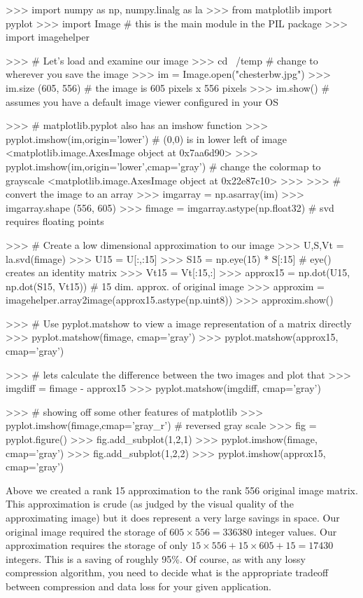\documentclass[11pt,letterpaper]{article}
\begin{document}
\begin{Pcode}
>>> import numpy as np, numpy.linalg as la
>>> from matplotlib import pyplot
>>> import Image # this is the main module in the PIL package
>>> import imagehelper

>>>  # Let's load and examine our image
>>> cd ~/temp # change to wherever you save the image
>>> im = Image.open("chesterbw.jpg")
>>> im.size
(605, 556) # the image is 605 pixels x 556 pixels
>>> im.show() # assumes you have a default image viewer configured in your OS
 
>>> # matplotlib.pyplot also has an imshow function
>>> pyplot.imshow(im,origin='lower') # (0,0) is in lower left of image
<matplotlib.image.AxesImage object at 0x7aa6d90>
>>> pyplot.imshow(im,origin='lower',cmap='gray') # change the colormap to grayscale
<matplotlib.image.AxesImage object at 0x22e87c10>
>>>
>>>   # convert the image to an array
>>> imgarray = np.asarray(im)
>>> imgarray.shape
(556, 605)
>>> fimage = imgarray.astype(np.float32) # svd requires floating points

>>>   # Create a low dimensional approximation to our image
>>> U,S,Vt = la.svd(fimage)
>>> U15 = U[:,:15]
>>> S15 = np.eye(15) * S[:15] # eye() creates an identity matrix
>>> Vt15 = Vt[:15,:]
>>> approx15 = np.dot(U15, np.dot(S15, Vt15)) # 15 dim. approx. of original image
>>> approxim = imagehelper.array2image(approx15.astype(np.uint8))
>>> approxim.show()

>>>    # Use pyplot.matshow to view a image representation of a matrix directly
>>> pyplot.matshow(fimage, cmap='gray')
>>> pyplot.matshow(approx15, cmap='gray')

>>>    # lets calculate the difference between the two images and plot that
>>> imgdiff = fimage - approx15
>>> pyplot.matshow(imgdiff, cmap='gray')

>>>    # showing off some other features of matplotlib
>>> pyplot.imshow(fimage,cmap='gray_r') # reversed gray scale
>>> fig = pyplot.figure()
>>> fig.add_subplot(1,2,1)
>>> pyplot.imshow(fimage, cmap='gray')
>>> fig.add_subplot(1,2,2)
>>> pyplot.imshow(approx15, cmap='gray')

\end{Pcode}

Above we created a rank 15 approximation to the rank 556 original image matrix. This approximation is crude (as judged by the visual quality of the approximating image) but it does represent a very large savings in space. Our original image required the storage of $605 \times 556 = 336380$ integer values. Our approximation requires the storage of only $15 \times 556 + 15 \times 605 + 15 = 17430$ integers. This is a saving of roughly 95\%. Of course, as with any lossy compression algorithm, you need to decide what is the appropriate tradeoff between compression and data loss for your given application.
\end{document}
